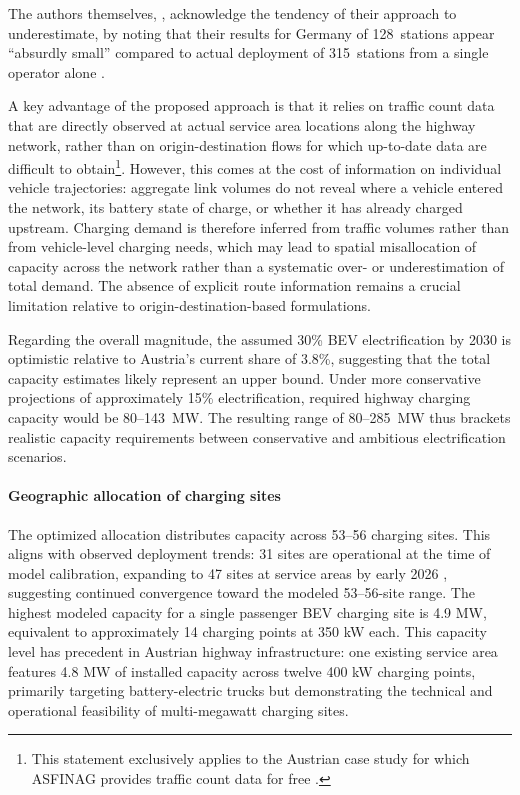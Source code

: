 The authors themselves, \citet{Jochem2019}, acknowledge the tendency of their approach to underestimate, by noting that their results for Germany of 128~stations appear ``absurdly small'' compared to actual deployment of 315~stations from a single operator alone \citep[p.~126]{Jochem2019}.

A key advantage of the proposed approach is that it relies on traffic count data that are directly observed at actual service area locations along the highway network, rather than on origin-destination flows for which up-to-date data are difficult to obtain\footnote{This statement exclusively applies to the Austrian case study for which ASFINAG provides traffic count data for free \cite{asfinag_verkehrszaehlung}.}. However, this comes at the cost of information on individual vehicle trajectories: aggregate link volumes do not reveal where a vehicle entered the network, its battery state of charge, or whether it has already charged upstream. Charging demand is therefore inferred from traffic volumes rather than from vehicle-level charging needs, which may lead to spatial misallocation of capacity across the network rather than a systematic over- or underestimation of total demand. The absence of explicit route information remains a crucial limitation relative to origin-destination-based formulations.

Regarding the overall magnitude, the assumed 30\% \ac{BEV} electrification by 2030 is optimistic relative to Austria's current share of 3.8\%, suggesting that the total capacity estimates likely represent an upper bound. Under more conservative projections of approximately 15\% electrification, required highway charging capacity would be 80--143~MW. The resulting range of 80--285~MW thus brackets realistic capacity requirements between conservative and ambitious electrification scenarios.


\paragraph*{Geographic allocation of charging sites}

The optimized allocation distributes capacity across 53--56 charging sites. This aligns with observed deployment trends: 31 sites are operational at the time of model calibration, expanding to 47 sites at service areas by early 2026 \citep{ASFINAG_Rastanlagensuche}, suggesting continued convergence toward the modeled 53--56-site range. The highest modeled capacity for a single passenger \ac{BEV} charging site is 4.9 MW, equivalent to approximately 14 charging points at 350 kW each. This capacity level has precedent in Austrian highway infrastructure: one existing service area features 4.8 MW of installed capacity across twelve 400 kW charging points, primarily targeting battery-electric trucks but demonstrating the technical and operational feasibility of multi-megawatt charging sites.

